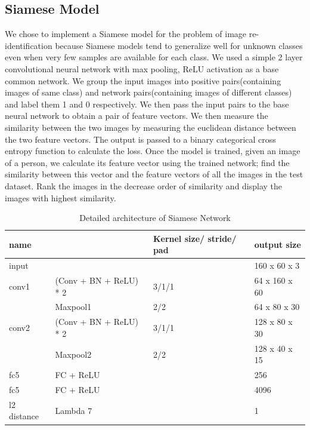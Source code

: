 \documentclass{article}[12pt,a4paper]
\begin{document}
\subsection{Siamese Model}
We chose to implement a Siamese model for the problem of image re-identification because Siamese models tend to generalize well for unknown classes even when very few samples are available for each class. We used a simple 2 layer convolutional neural network with max pooling, ReLU activation as a base common network. We group the input images into positive pairs(containing images of same class) and network pairs(containing images of different classes) and label them 1 and 0 respectively. We then pass the input pairs to the base neural network to obtain a pair of feature vectors. We then measure the similarity between the two images by measuring the euclidean distance between the two feature vectors. The output is passed to a binary categorical cross entropy function to calculate the loss. Once the model is trained, given an image of a person, we calculate its feature vector using the trained network; find the similarity between this vector and the feature vectors of all the images in the test dataset. Rank the images in the decrease order of similarity and display the images with highest similarity.
\vspace{3em}
\begin{table}[h]
\begin{center}
\begin{tabular}{|l|l|l|l|}
\hline
name & & Kernel size/ stride/ pad & output size \\
\hline
input & & & 160 x 60 x 3 \\
\hline
conv1 & (Conv + BN + ReLU) * 2 & 3/1/1 & 64 x 160 x 60 \\
\hline
& Maxpool1 & 2/2 & 64 x 80 x 30 \\
\hline
conv2 & (Conv + BN + ReLU) * 2 & 3/1/1 & 128 x 80 x 30 \\
\hline
& Maxpool2 & 2/2 & 128 x 40 x 15 \\
\hline
fc5 & FC + ReLU & & 256 \\
\hline
fc5 & FC + ReLU & & 4096 \\
\hline
l2 distance & Lambda 7 & & 1 \\
\hline
\end{tabular}
\caption{Detailed architecture of Siamese Network}
\end{center}
\end{table}
\end{document}
